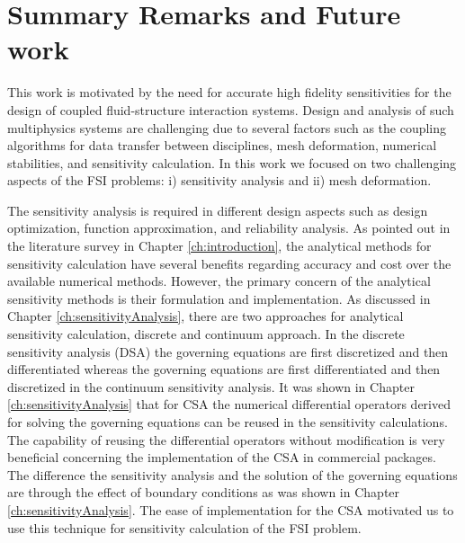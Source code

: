 \chapter{Summary Remarks and Future work}
This work is motivated by the need for accurate high fidelity sensitivities for the design of coupled fluid-structure interaction systems. Design and analysis of such multiphysics systems are challenging due to several factors such as the coupling algorithms for data transfer between disciplines, mesh deformation, numerical stabilities, and sensitivity calculation. In this work we focused on two challenging aspects of the FSI problems: i) sensitivity analysis and ii) mesh deformation.

The sensitivity analysis is required in different design aspects such as design optimization, function approximation, and reliability analysis. As pointed out in the literature survey in Chapter \ref{ch:introduction}, the analytical methods for sensitivity calculation have several benefits regarding accuracy and cost over the available numerical methods. However, the primary concern of the analytical sensitivity methods is their formulation and implementation. As discussed in Chapter \ref{ch:sensitivityAnalysis}, there are two approaches for analytical sensitivity calculation, discrete and continuum approach. In the discrete sensitivity analysis (DSA) the governing equations are first discretized and then differentiated whereas the governing equations are first differentiated and then discretized in the continuum sensitivity analysis. It was shown in Chapter \ref{ch:sensitivityAnalysis} that for CSA the numerical differential operators derived for solving the governing equations can be reused in the sensitivity calculations. The capability of reusing the differential operators without modification is very beneficial concerning the implementation of the CSA in commercial packages. The difference the sensitivity analysis and the solution of the governing equations are through the effect of boundary conditions as was shown in Chapter \ref{ch:sensitivityAnalysis}. The ease of implementation for the CSA motivated us to use this technique for sensitivity calculation of the FSI problem.


